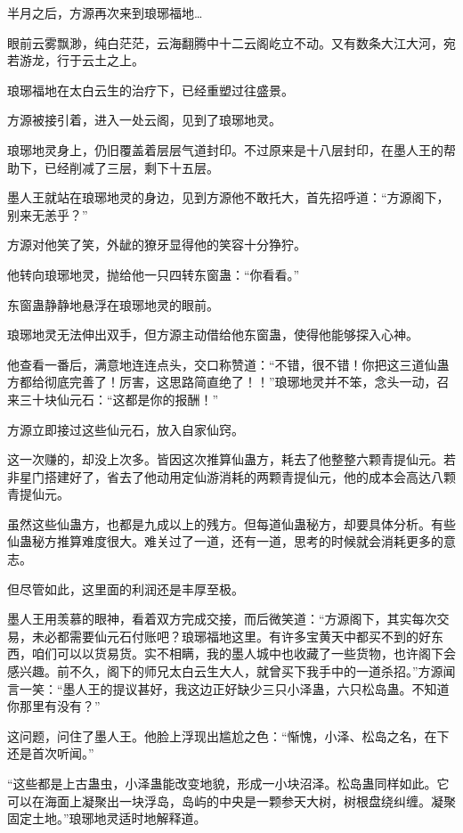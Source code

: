 
\begin{this_body}

半月之后，方源再次来到琅琊福地…

眼前云雾飘渺，纯白茫茫，云海翻腾中十二云阁屹立不动。又有数条大江大河，宛若游龙，行于云土之上。

琅琊福地在太白云生的治疗下，已经重塑过往盛景。

方源被接引着，进入一处云阁，见到了琅琊地灵。

琅琊地灵身上，仍旧覆盖着层层气道封印。不过原来是十八层封印，在墨人王的帮助下，已经削减了三层，剩下十五层。

墨人王就站在琅琊地灵的身边，见到方源他不敢托大，首先招呼道：“方源阁下，别来无恙乎？”

方源对他笑了笑，外龇的獠牙显得他的笑容十分狰狞。

他转向琅琊地灵，抛给他一只四转东窗蛊：“你看看。”

东窗蛊静静地悬浮在琅琊地灵的眼前。

琅琊地灵无法伸出双手，但方源主动借给他东窗蛊，使得他能够探入心神。

他查看一番后，满意地连连点头，交口称赞道：“不错，很不错！你把这三道仙蛊方都给彻底完善了！厉害，这思路简直绝了！！”琅琊地灵并不笨，念头一动，召来三十块仙元石：“这都是你的报酬！”

方源立即接过这些仙元石，放入自家仙窍。

这一次赚的，却没上次多。皆因这次推算仙蛊方，耗去了他整整六颗青提仙元。若非星门搭建好了，省去了他动用定仙游消耗的两颗青提仙元，他的成本会高达八颗青提仙元。

虽然这些仙蛊方，也都是九成以上的残方。但每道仙蛊秘方，却要具体分析。有些仙蛊秘方推算难度很大。难关过了一道，还有一道，思考的时候就会消耗更多的意志。

但尽管如此，这里面的利润还是丰厚至极。

墨人王用羡慕的眼神，看着双方完成交接，而后微笑道：“方源阁下，其实每次交易，未必都需要仙元石付账吧？琅琊福地这里。有许多宝黄天中都买不到的好东西，咱们可以以货易货。实不相瞒，我的墨人城中也收藏了一些货物，也许阁下会感兴趣。前不久，阁下的师兄太白云生大人，就曾买下我手中的一道杀招。”方源闻言一笑：“墨人王的提议甚好，我这边正好缺少三只小泽蛊，六只松岛蛊。不知道你那里有没有？”

这问题，问住了墨人王。他脸上浮现出尴尬之色：“惭愧，小泽、松岛之名，在下还是首次听闻。”

“这些都是上古蛊虫，小泽蛊能改变地貌，形成一小块沼泽。松岛蛊同样如此。它可以在海面上凝聚出一块浮岛，岛屿的中央是一颗参天大树，树根盘绕纠缠。凝聚固定土地。”琅琊地灵适时地解释道。


\end{this_body}
